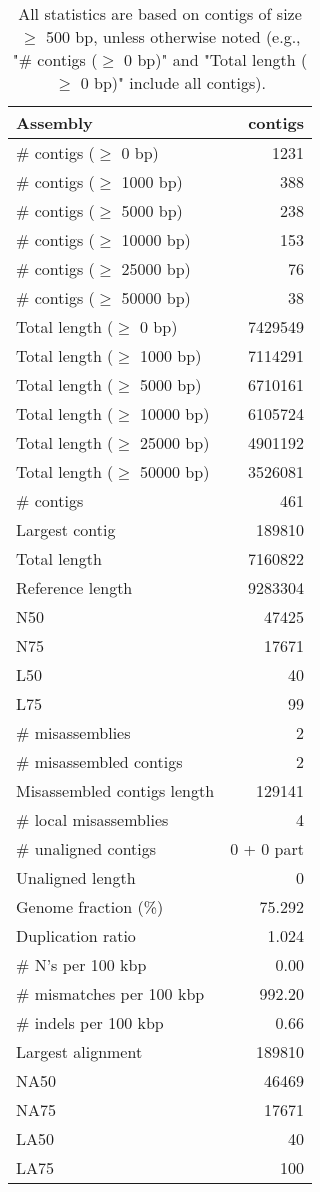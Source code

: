\documentclass[12pt,a4paper]{article}
\begin{document}
\begin{table}[ht]
\begin{center}
\caption{All statistics are based on contigs of size $\geq$ 500 bp, unless otherwise noted (e.g., "\# contigs ($\geq$ 0 bp)" and "Total length ($\geq$ 0 bp)" include all contigs).}
\begin{tabular}{|l*{1}{|r}|}
\hline
Assembly & contigs \\ \hline
\# contigs ($\geq$ 0 bp) & 1231 \\ \hline
\# contigs ($\geq$ 1000 bp) & 388 \\ \hline
\# contigs ($\geq$ 5000 bp) & 238 \\ \hline
\# contigs ($\geq$ 10000 bp) & 153 \\ \hline
\# contigs ($\geq$ 25000 bp) & 76 \\ \hline
\# contigs ($\geq$ 50000 bp) & 38 \\ \hline
Total length ($\geq$ 0 bp) & 7429549 \\ \hline
Total length ($\geq$ 1000 bp) & 7114291 \\ \hline
Total length ($\geq$ 5000 bp) & 6710161 \\ \hline
Total length ($\geq$ 10000 bp) & 6105724 \\ \hline
Total length ($\geq$ 25000 bp) & 4901192 \\ \hline
Total length ($\geq$ 50000 bp) & 3526081 \\ \hline
\# contigs & 461 \\ \hline
Largest contig & 189810 \\ \hline
Total length & 7160822 \\ \hline
Reference length & 9283304 \\ \hline
N50 & 47425 \\ \hline
N75 & 17671 \\ \hline
L50 & 40 \\ \hline
L75 & 99 \\ \hline
\# misassemblies & 2 \\ \hline
\# misassembled contigs & 2 \\ \hline
Misassembled contigs length & 129141 \\ \hline
\# local misassemblies & 4 \\ \hline
\# unaligned contigs & 0 + 0 part \\ \hline
Unaligned length & 0 \\ \hline
Genome fraction (\%) & 75.292 \\ \hline
Duplication ratio & 1.024 \\ \hline
\# N's per 100 kbp & 0.00 \\ \hline
\# mismatches per 100 kbp & 992.20 \\ \hline
\# indels per 100 kbp & 0.66 \\ \hline
Largest alignment & 189810 \\ \hline
NA50 & 46469 \\ \hline
NA75 & 17671 \\ \hline
LA50 & 40 \\ \hline
LA75 & 100 \\ \hline
\end{tabular}
\end{center}
\end{table}
\end{document}
